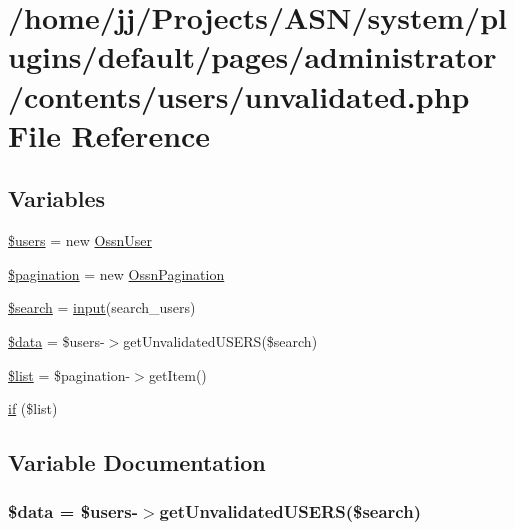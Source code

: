 \hypertarget{unvalidated_8php}{}\section{/home/jj/\+Projects/\+A\+S\+N/system/plugins/default/pages/administrator/contents/users/unvalidated.php File Reference}
\label{unvalidated_8php}
\subsection*{Variables}
\begin{DoxyCompactItemize}
\item 
\hyperlink{unvalidated_8php_a28005d22fa7ef2dfe215ad886b497d9c}{\$users} = new \hyperlink{class_ossn_user}{Ossn\+User}
\item 
\hyperlink{unvalidated_8php_a388a4a950e936f746d3b9c1b56450ce7}{\$pagination} = new \hyperlink{class_ossn_pagination}{Ossn\+Pagination}
\item 
\hyperlink{unvalidated_8php_ae549977dd05a017aa81372f6994bf955}{\$search} = \hyperlink{ossn_8lib_8input_8php_a64ebee98b041c4f75f71ed3cd73cc8ed}{input}(\textquotesingle{}search\+\_\+users\textquotesingle{})
\item 
\hyperlink{unvalidated_8php_a6efc15b5a2314dd4b5aaa556a375c6d6}{\$data} = \$users-\/$>$get\+Unvalidated\+U\+S\+E\+RS(\$search)
\item 
\hyperlink{unvalidated_8php_a358b00350db3d8f227d500337cc437af}{\$list} = \$pagination-\/$>$get\+Item()
\item 
\hyperlink{unvalidated_8php_ad5b470d0a25b1bac17fbfa5e12e14b74}{if} (\$list)
\end{DoxyCompactItemize}


\subsection{Variable Documentation}
\subsubsection[{\texorpdfstring{\$data}{$data}}]{\setlength{\rightskip}{0pt plus 5cm}\${\bf data} = \$users-\/$>$get\+Unvalidated\+U\+S\+E\+RS(\$search)}\hypertarget{unvalidated_8php_a6efc15b5a2314dd4b5aaa556a375c6d6}{}\label{unvalidated_8php_a6efc15b5a2314dd4b5aaa556a375c6d6}


